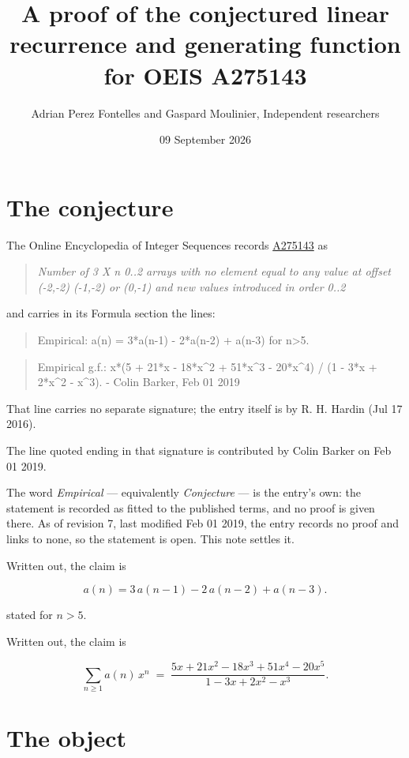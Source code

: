 \documentclass[11pt]{article}
\title{A proof of the conjectured linear recurrence and generating function for OEIS A275143}
\author{Adrian Perez Fontelles and Gaspard Moulinier, Independent researchers}
\date{09 September 2026}
\theoremstyle{definition}
\begin{document}
\maketitle
\section{The conjecture}

The Online Encyclopedia of Integer Sequences records \href{https://oeis.org/A275143}{A275143} as

\begin{quote}\itshape Number of 3 X n 0..2 arrays with no element equal to any value at offset (-2,-2) (-1,-2) or (0,-1) and new values introduced in order 0..2\end{quote}

and carries in its Formula section the lines:

\begin{quote}\ttfamily Empirical: a(n) = 3*a(n-1) - 2*a(n-2) + a(n-3) for n>5.\end{quote}

\begin{quote}\ttfamily Empirical g.f.: x*(5 + 21*x - 18*x\textasciicircum{}2 + 51*x\textasciicircum{}3 - 20*x\textasciicircum{}4) / (1 - 3*x + 2*x\textasciicircum{}2 - x\textasciicircum{}3). - Colin Barker, Feb 01 2019\end{quote}

That line carries no separate signature; the entry itself is by R. H. Hardin (Jul 17 2016).

The line quoted ending in that signature is contributed by Colin Barker on Feb 01 2019.

The word {\itshape Empirical} --- equivalently {\itshape Conjecture} --- is the entry's own: the statement is recorded as fitted to the published terms, and no proof is given there. As of revision 7, last modified Feb 01 2019, the entry records no proof and links to none, so the statement is open. This note settles it.

Written out, the claim is

\[a(n) = 3\,a(n-1) - 2\,a(n-2) + a(n-3).\]

stated for $n > 5$.

Written out, the claim is

\[\sum_{n \ge 1} a(n)\,x^n \;=\; \frac{5x + 21x^{2} - 18x^{3} + 51x^{4} - 20x^{5}}{1 - 3x + 2x^{2} - x^{3}}.\]

\section{The object}
\end{document}

